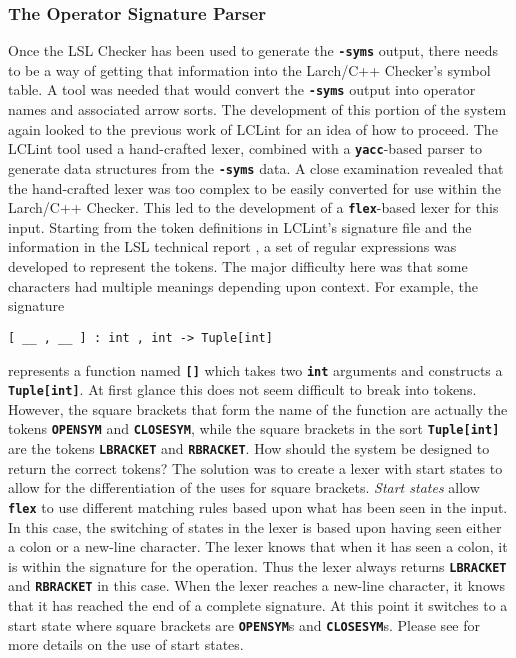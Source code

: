 \documentclass[12pt]{article} %
\newcommand{\reserved}[1]{\textbf{\texttt{#1}}} %
\begin{document}
\subsubsection{The Operator Signature Parser}
Once the LSL Checker has been used to generate the \reserved{-syms}
output, there needs to be a way of getting that information into the
Larch/C++ Checker's symbol table. A tool was needed that would convert
the \reserved{-syms} output into operator names and associated arrow
sorts. The development of this portion of the system again looked to
the previous work of LCLint for an idea of how to proceed. The LCLint
tool used a hand-crafted lexer, combined with a \reserved{yacc}-based
parser to generate data structures from the
\reserved{-syms} data. A close examination revealed that the
hand-crafted lexer was too complex to be easily converted for use
within the Larch/C++ Checker. This led to the development of a
\reserved{flex}-based lexer for this input. Starting from the token
definitions in LCLint's signature file and the information in the LSL
technical report \cite{Guttag-Horning-Modet90}, a set of regular
expressions was developed to represent the tokens. The major
difficulty here was that some characters had multiple meanings
depending upon context. For example, the signature
\begin{verbatim}
[ __ , __ ] : int , int -> Tuple[int]
\end{verbatim} 
represents a function named \reserved{[]} which takes two
\reserved{int} arguments and constructs a \reserved{Tuple[int]}. At
first glance this does not seem difficult to break into
tokens. However, the square brackets that form the name of the
function are actually the tokens \reserved{OPENSYM} and
\reserved{CLOSESYM}, while the square brackets in the sort
\reserved{Tuple[int]} are the tokens \reserved{LBRACKET} and \reserved{RBRACKET}. How should
the system be designed to return the correct tokens? The solution was
to create a lexer with start states to allow for the differentiation
of the uses for square brackets. \emph{Start states} allow \reserved{flex} to use
different matching rules based upon what has been seen in the
input. In this case, the switching of states in the lexer is based
upon having seen either a colon or a new-line character. The lexer
knows that when it has seen a colon, it is within the signature for
the operation. Thus the lexer always returns \reserved{LBRACKET} and
\reserved{RBRACKET} in 
this case. When the lexer reaches a new-line character, it knows that
it has reached the end of a complete signature. At this point it
switches to a start state where square brackets are \reserved{OPENSYM}s and
\reserved{CLOSESYM}s. Please see
\cite{Levine-Mason-Brown92} for more details on the use of start states.
\end{document}
